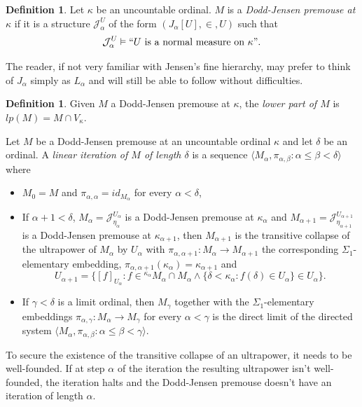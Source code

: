 \documentclass{amsart}
\numberwithin{equation}{section}
\theoremstyle{definition}
\newtheorem{definition}[theorem]{Definition}
\theoremstyle{remark}
\begin{document}
    \begin{definition}\label{definition:dj-premouse} Let $\kappa$ be an uncountable ordinal. $M$ is a \emph{Dodd-Jensen premouse at $\kappa$} if it is a structure $\mathcal{J}^{U}_{\alpha}$ of the form $( J_{\alpha}[U],\in,U)$ such that $$\mathcal{J}_{\alpha}^{U}\vDash``U \text{ is a normal measure on } \kappa".$$
    \end{definition}
    
    The reader, if not very familiar with Jensen's fine hierarchy, may prefer to think of $J_{\alpha}$ simply as $L_{\alpha}$ and will still be able to follow without difficulties.

    \begin{definition} Given $M$ a Dodd-Jensen premouse at $\kappa$, the \emph{lower part of $M$} is $lp(M)=M\cap V_{\kappa}$.
    \end{definition}

    Let $M$ be a Dodd-Jensen premouse at an uncountable ordinal $\kappa$ and let $\delta$ be an ordinal. A \emph{linear iteration of $M$ of length $\delta$} is a sequence $\langle M_{\alpha},\pi_{\alpha,\beta}:\alpha\leq\beta<\delta\rangle$ where
\begin{itemize}
	\item[(1)] $M_{0}=M$ and $\pi_{\alpha,\alpha}=id_{M_{\alpha}}$ for every $\alpha<\delta$,
	\item[(2)] If $\alpha+1<\delta$, $M_{\alpha}=\mathcal{J}^{U_{\alpha}}_{\eta_{\alpha}}$ is a Dodd-Jensen premouse at $\kappa_{\alpha}$ and $M_{\alpha+1}=\mathcal{J}^{U_{\alpha+1}}_{\eta_{\alpha+1}}$ is a Dodd-Jensen premouse at $\kappa_{\alpha+1}$, then $M_{\alpha+1}$ is the transitive collapse of the ultrapower of $M_{\alpha}$ by $U_{\alpha}$ with $\pi_{\alpha,\alpha+1}:M_{\alpha}\longrightarrow M_{\alpha+1}$ the corresponding $\Sigma_1$-elementary embedding, $\pi_{\alpha,\alpha+1}(\kappa_{\alpha})=\kappa_{\alpha+1}$ and 
	\[
	U_{\alpha+1}=\{[f]_{U_{\alpha}}:f\in  {}^{\kappa_{\alpha}}M_{\alpha}\cap M_{\alpha}\wedge \{\delta<\kappa_{\alpha}:f(\delta)\in U_{\alpha}\}\in U_{\alpha}\}.
	\]
	\item[(3)] If $\gamma<\delta$ is a limit ordinal, then $M_{\gamma}$ together with the $\Sigma_1$-elementary embeddings $\pi_{\alpha,\gamma}:M_{\alpha}\longrightarrow M_{\gamma}$ for every $\alpha<\gamma$ is the direct limit of the directed system $\langle M_{\alpha},\pi_{\alpha,\beta}:\alpha\leq\beta<\gamma\rangle$. 
\end{itemize}

To secure the existence of the transitive collapse of an ultrapower, it needs to be well-founded. If at step $\alpha$ of the iteration the resulting ultrapower isn't well-founded, the iteration halts and the Dodd-Jensen premouse doesn't have an iteration of length $\alpha$.
\end{document}

